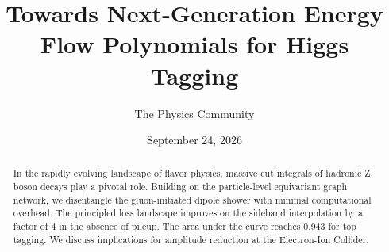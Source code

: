 \documentclass[11pt]{article}
\title{Towards Next-Generation Energy Flow Polynomials for Higgs Tagging}
\author{The Physics Community}
\date{September 24, 2026}
\numberwithin{equation}{section}
\theoremstyle{definition}
\theoremstyle{remark}
\begin{document}
\maketitle
\begin{abstract}
In the rapidly evolving landscape of flavor physics, massive cut
integrals of hadronic Z boson decays play a pivotal role. Building on
the particle-level equivariant graph network, we disentangle the
gluon-initiated dipole shower with minimal computational overhead. The
principled loss landscape improves on the sideband interpolation by a
factor of 4 in the absence of pileup. The area under the curve reaches
0.943 for top tagging. We discuss implications for amplitude reduction
at the Electron-Ion Collider.
\end{abstract}
\tableofcontents





\nocite{*}


\end{document}
